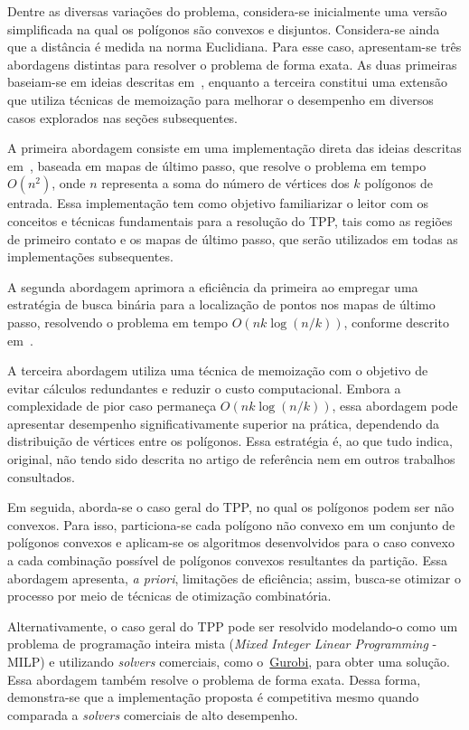 \documentclass[11pt]{article}
\begin{document}
Dentre as diversas variações do problema, considera-se inicialmente uma versão simplificada na qual os polígonos são convexos e disjuntos. Considera-se ainda que a distância é medida na norma Euclidiana. Para esse caso, apresentam-se três abordagens distintas para resolver o problema de forma exata. As duas primeiras baseiam-se em ideias descritas em~\cite{tpp-dror2003}, enquanto a terceira constitui uma extensão que utiliza técnicas de memoização para melhorar o desempenho em diversos casos explorados nas seções subsequentes.

A primeira abordagem consiste em uma implementação direta das ideias descritas em~\cite{tpp-dror2003}, baseada em mapas de último passo, que resolve o problema em tempo $O(n^2)$, onde $n$ representa a soma do número de vértices dos $k$ polígonos de entrada. Essa implementação tem como objetivo familiarizar o leitor com os conceitos e técnicas fundamentais para a resolução do TPP, tais como as regiões de primeiro contato e os mapas de último passo, que serão utilizados em todas as implementações subsequentes.

A segunda abordagem aprimora a eficiência da primeira ao empregar uma estratégia de busca binária para a localização de pontos nos mapas de último passo, resolvendo o problema em tempo $O(n k \log (n / k))$, conforme descrito em~\cite{tpp-dror2003}.

A terceira abordagem utiliza uma técnica de memoização com o objetivo de evitar cálculos redundantes e reduzir o custo computacional. Embora a complexidade de pior caso permaneça $O(n k \log (n / k))$, essa abordagem pode apresentar desempenho significativamente superior na prática, dependendo da distribuição de vértices entre os polígonos. Essa estratégia é, ao que tudo indica, original, não tendo sido descrita no artigo de referência nem em outros trabalhos consultados.

Em seguida, aborda-se o caso geral do TPP, no qual os polígonos podem ser não convexos. Para isso, particiona-se cada polígono não convexo em um conjunto de polígonos convexos e aplicam-se os algoritmos desenvolvidos para o caso convexo a cada combinação possível de polígonos convexos resultantes da partição. Essa abordagem apresenta, \textit{a priori}, limitações de eficiência; assim, busca-se otimizar o processo por meio de técnicas de otimização combinatória.

Alternativamente, o caso geral do TPP pode ser resolvido modelando-o como um problema de programação inteira mista (\textit{Mixed Integer Linear Programming} - MILP) e utilizando \textit{solvers} comerciais, como o~\href{https://www.gurobi.com}{Gurobi}, para obter uma solução. Essa abordagem também resolve o problema de forma exata. Dessa forma, demonstra-se que a implementação proposta é competitiva mesmo quando comparada a \textit{solvers} comerciais de alto desempenho.
\end{document}
